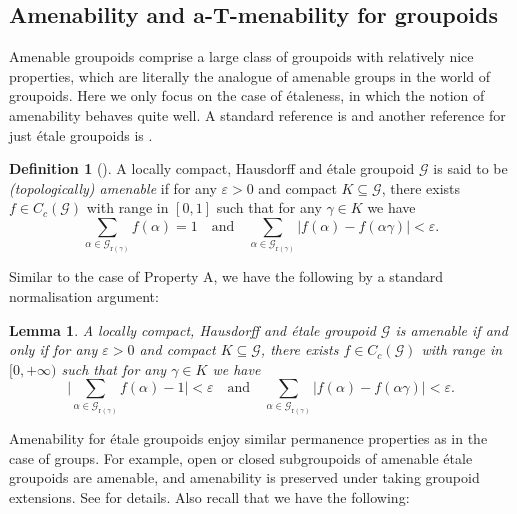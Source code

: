 \documentclass[12pt, a4paper]{amsart}
\numberwithin{equation}{section}
\newtheorem{lem}[thm]{Lemma}
\theoremstyle{definition}
\newtheorem{defn}[thm]{Definition}
\theoremstyle{remark}
\def\G{\mathcal{G}}
\def\r{\mathrm{r}}
\begin{document}


\subsection{Amenability and a-T-menability for groupoids}\label{ssec: amenability}
Amenable groupoids comprise a large class of groupoids with relatively nice properties, which are literally the analogue of amenable groups in the world of groupoids. Here we only focus on the case of \'{e}taleness, in which the notion of amenability behaves quite well. A standard reference is \cite{ADR00} and another reference for just \'{e}tale groupoids is \cite[Chapter 5.6]{BO08}.

\begin{defn}[\cite{ADR00}]\label{defn: amenable groupoid}
A locally compact, Hausdorff and \'{e}tale groupoid $\G$ is said to be \emph{(topologically) amenable} if for any $\varepsilon>0$ and compact $K \subseteq \G$, there exists $f \in C_c(\G)$ with range in $[0,1]$ such that for any $\gamma \in K$ we have
\[
\sum_{\alpha \in \G_{\r(\gamma)}} f(\alpha) =1  \quad \mbox{and} \quad \sum_{\alpha \in \G_{\r(\gamma)}} |f(\alpha) - f(\alpha\gamma)| < \varepsilon.
\]
\end{defn}

Similar to the case of Property A, we have the following by a standard normalisation argument:

\begin{lem}\label{lem:elementary char for amenable groupoid}
A locally compact, Hausdorff and \'{e}tale groupoid $\G$ is amenable \emph{if and only if} for any $\varepsilon>0$ and compact $K \subseteq \G$, there exists $f \in C_c(\G)$ with range in $[0,+\infty)$ such that for any $\gamma \in K$ we have
\[
\big| \sum_{\alpha \in \G_{\r(\gamma)}} f(\alpha) - 1 \big| < \varepsilon  \quad \mbox{and} \quad \sum_{\alpha \in \G_{\r(\gamma)}} |f(\alpha) - f(\alpha\gamma)| < \varepsilon.
\]
\end{lem}

Amenability for \'{e}tale groupoids enjoy similar permanence properties as in the case of groups. For example, open or closed subgroupoids of amenable \'{e}tale groupoids are amenable, and amenability is preserved under taking groupoid extensions. See \cite[Section 5]{ADR00} for details. Also recall that we have the following:
\end{document}
